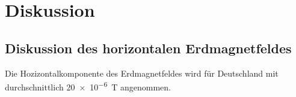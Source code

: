\section{Diskussion}
\label{sec:Diskussion}
\subsection{}
\subsection{Diskussion des horizontalen Erdmagnetfeldes}
Die Hozizontalkomponente des Erdmagnetfeldes wird für Deutschland mit durchschnittlich \SI{20e-6}{\tesla} \cite{lausitz} angenommen.

\subsection{}